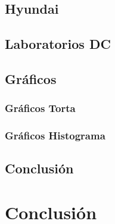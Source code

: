 \documentclass[final,narroweqnarray,inline]{ieee}
\begin{document}
  \subsection{Hyundai}

  \subsection{Laboratorios DC}

  \subsection{Gráficos}
  \subsubsection*{Gráficos Torta}
  \subsubsection*{Gráficos Histograma}

  \subsection{Conclusión}

\newpage
\section{Conclusión}

%
%



\end{document}
